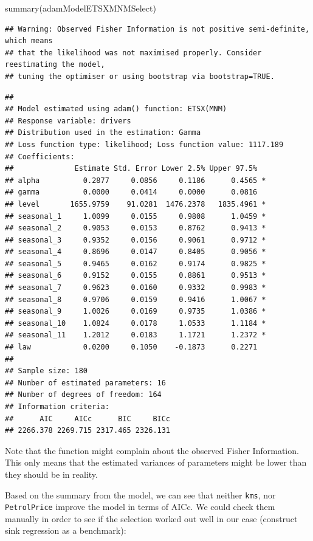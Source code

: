 \documentclass[
]{book}
\newenvironment{Shaded}{\begin{snugshade}}{\end{snugshade}}
\newcommand{\FunctionTok}[1]{\textcolor[rgb]{0.00,0.00,0.00}{#1}}
\newcommand{\NormalTok}[1]{#1}
\theoremstyle{definition}
\theoremstyle{definition}
\theoremstyle{definition}
\theoremstyle{definition}
\theoremstyle{remark}
\begin{document}
\begin{Shaded}
\begin{Highlighting}[]
\FunctionTok{summary}\NormalTok{(adamModelETSXMNMSelect)}
\end{Highlighting}
\end{Shaded}

\begin{verbatim}
## Warning: Observed Fisher Information is not positive semi-definite, which means
## that the likelihood was not maximised properly. Consider reestimating the model,
## tuning the optimiser or using bootstrap via bootstrap=TRUE.
\end{verbatim}

\begin{verbatim}
## 
## Model estimated using adam() function: ETSX(MNM)
## Response variable: drivers
## Distribution used in the estimation: Gamma
## Loss function type: likelihood; Loss function value: 1117.189
## Coefficients:
##              Estimate Std. Error Lower 2.5% Upper 97.5%  
## alpha          0.2877     0.0856     0.1186      0.4565 *
## gamma          0.0000     0.0414     0.0000      0.0816  
## level       1655.9759    91.0281  1476.2378   1835.4961 *
## seasonal_1     1.0099     0.0155     0.9808      1.0459 *
## seasonal_2     0.9053     0.0153     0.8762      0.9413 *
## seasonal_3     0.9352     0.0156     0.9061      0.9712 *
## seasonal_4     0.8696     0.0147     0.8405      0.9056 *
## seasonal_5     0.9465     0.0162     0.9174      0.9825 *
## seasonal_6     0.9152     0.0155     0.8861      0.9513 *
## seasonal_7     0.9623     0.0160     0.9332      0.9983 *
## seasonal_8     0.9706     0.0159     0.9416      1.0067 *
## seasonal_9     1.0026     0.0169     0.9735      1.0386 *
## seasonal_10    1.0824     0.0178     1.0533      1.1184 *
## seasonal_11    1.2012     0.0183     1.1721      1.2372 *
## law            0.0200     0.1050    -0.1873      0.2271  
## 
## Sample size: 180
## Number of estimated parameters: 16
## Number of degrees of freedom: 164
## Information criteria:
##      AIC     AICc      BIC     BICc 
## 2266.378 2269.715 2317.465 2326.131
\end{verbatim}

Note that the function might complain about the observed Fisher Information. This only means that the estimated variances of parameters might be lower than they should be in reality.

Based on the summary from the model, we can see that neither \texttt{kms}, nor \texttt{PetrolPrice} improve the model in terms of AICc. We could check them manually in order to see if the selection worked out well in our case (construct sink regression as a benchmark):
\end{document}
